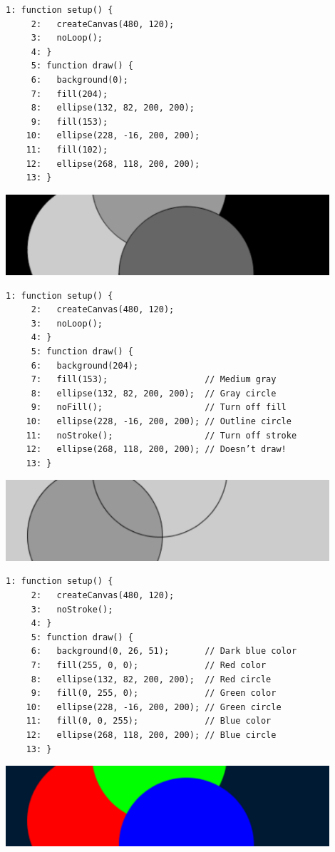 \documentclass[a4j]{ltjsarticle}
\begin{document}
\begin{lstlisting}[caption=Ex\_03\_15.js]
     1: function setup() {
     2:   createCanvas(480, 120);
     3:   noLoop();
     4: }
     5: function draw() {
     6:   background(0);
     7:   fill(204);
     8:   ellipse(132, 82, 200, 200);
     9:   fill(153);
    10:   ellipse(228, -16, 200, 200);
    11:   fill(102);
    12:   ellipse(268, 118, 200, 200);
    13: }
\end{lstlisting}
\includegraphics[height=3cm]{image/Ex_03_15.pdf}
\begin{lstlisting}[caption=Ex\_03\_16.js]
     1: function setup() {
     2:   createCanvas(480, 120);
     3:   noLoop();
     4: }
     5: function draw() {
     6:   background(204);
     7:   fill(153);                   // Medium gray
     8:   ellipse(132, 82, 200, 200);  // Gray circle
     9:   noFill();                    // Turn off fill
    10:   ellipse(228, -16, 200, 200); // Outline circle
    11:   noStroke();                  // Turn off stroke
    12:   ellipse(268, 118, 200, 200); // Doesn’t draw!
    13: }
\end{lstlisting}
\includegraphics[height=3cm]{image/Ex_03_16.pdf}
\begin{lstlisting}[caption=Ex\_03\_17.js]
     1: function setup() {
     2:   createCanvas(480, 120);
     3:   noStroke();
     4: }
     5: function draw() {
     6:   background(0, 26, 51);       // Dark blue color
     7:   fill(255, 0, 0);             // Red color
     8:   ellipse(132, 82, 200, 200);  // Red circle
     9:   fill(0, 255, 0);             // Green color
    10:   ellipse(228, -16, 200, 200); // Green circle
    11:   fill(0, 0, 255);             // Blue color
    12:   ellipse(268, 118, 200, 200); // Blue circle
    13: }
\end{lstlisting}
\includegraphics[height=3cm]{image/Ex_03_17.pdf}
\end{document}

